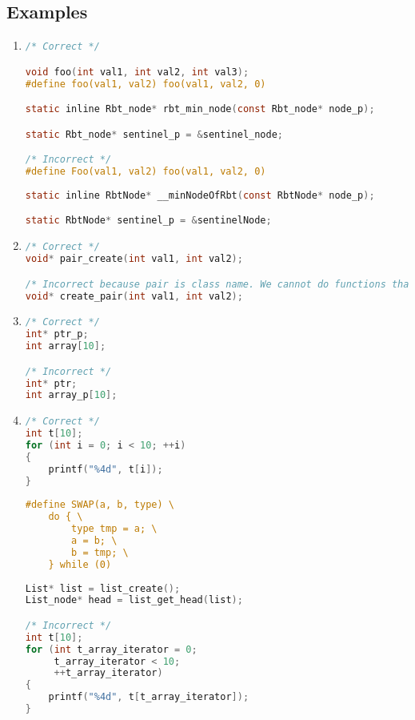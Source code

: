 \subsection{Examples}
\begin{enumerate}
    \item 
\begin{lstlisting}[language=C,style=C99]
/* Correct */

void foo(int val1, int val2, int val3);
#define foo(val1, val2) foo(val1, val2, 0) 

static inline Rbt_node* rbt_min_node(const Rbt_node* node_p);

static Rbt_node* sentinel_p = &sentinel_node;

/* Incorrect */
#define Foo(val1, val2) foo(val1, val2, 0)
     
static inline RbtNode* __minNodeOfRbt(const RbtNode* node_p);

static RbtNode* sentinel_p = &sentinelNode;
\end{lstlisting}
    
    \item 
\begin{lstlisting}[language=C,style=C99]
/* Correct */
void* pair_create(int val1, int val2);

/* Incorrect because pair is class name. We cannot do functions that begin with create, get, make etc. Instead of it we add prefix which contains class name */
void* create_pair(int val1, int val2);
\end{lstlisting}

    \item 
\begin{lstlisting}[language=C,style=C99]
/* Correct */
int* ptr_p;
int array[10];

/* Incorrect */
int* ptr;
int array_p[10];
\end{lstlisting}

    \item
\begin{lstlisting}[language=C,style=C99]
/* Correct */
int t[10];
for (int i = 0; i < 10; ++i)
{
    printf("%4d", t[i]);
}
    
#define SWAP(a, b, type) \
    do { \
        type tmp = a; \
        a = b; \
        b = tmp; \
    } while (0)
    
List* list = list_create();
List_node* head = list_get_head(list);

/* Incorrect */
int t[10];
for (int t_array_iterator = 0;
     t_array_iterator < 10;
     ++t_array_iterator)
{
    printf("%4d", t[t_array_iterator]);
}
    

\end{lstlisting}
\end{enumerate}
